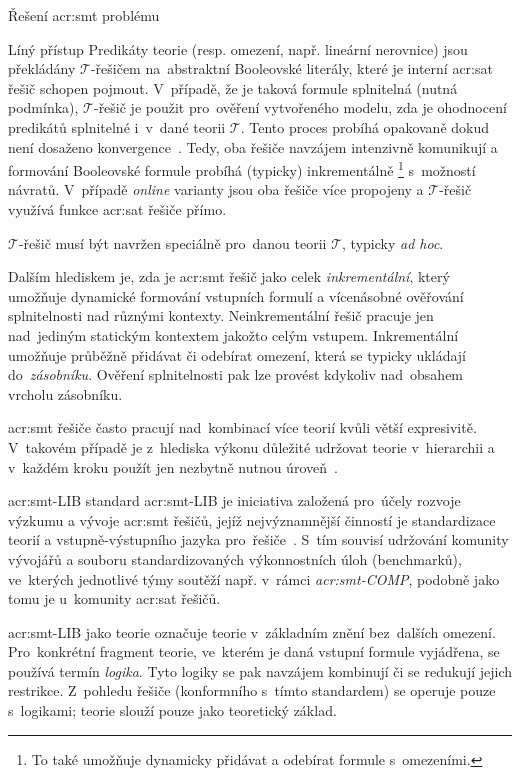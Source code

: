 \documentclass[thesis=M,czech]{FITthesis}[2012/06/26]
\newcommand{\acrlabel}[1]{acr:#1}
\newcommand{\acr}[1]{\acrshort{\acrlabel{#1}}}
\newcommand{\hl}[1]{\textit{#1}}
\newcommand{\name}[1]{\hl{#1}}
\newcommand{\cit}[1]{\cite{#1}}
\newcommand{\set}[1]{\ensuremath{\mathcal{#1}}}
\begin{document}
\begin{section}{Řešení \acr{smt} problému}
\begin{paragraph}{Líný přístup}
Predikáty teorie (resp. omezení, např. lineární nerovnice)
jsou překládány \set{T}-řešičem
na~abstraktní Booleovské literály,
které je interní \acr{sat} řešič schopen pojmout.
V~případě, že je taková formule splnitelná (nutná podmínka),
\set{T}-řešič je použit pro~ověření vytvořeného modelu,
zda je ohodnocení predikátů splnitelné i~v~dané teorii \set{T}.
Tento proces probíhá opakovaně
dokud není dosaženo konvergence~\cit{smt-de_moura}.
Tedy, oba řešiče navzájem intenzivně komunikují
a formování Booleovské formule probíhá (typicky) inkrementálně%
\footnote{To také umožňuje dynamicky
přidávat a odebírat formule s~omezeními.}
s~možností návratů.
V~případě \name{online} varianty jsou oba řešiče
více propojeny a \set{T}-řešič využívá funkce \acr{sat} řešiče přímo.

\set{T}-řešič musí být navržen
speciálně pro~danou teorii \set{T}, typicky \hl{ad hoc}.
\end{paragraph} %


\bigskip

Dalším hlediskem je, zda je \acr{smt} řešič jako celek
\name{inkrementální}, který umožňuje
dynamické formování vstupních formulí
a vícenásobné ověřování splnitelnosti nad různými kontexty.
Neinkrementální řešič pracuje jen nad~jediným statickým kontextem
jakožto celým vstupem. Inkrementální umožňuje
průběžně přidávat či odebírat omezení,
která se typicky ukládají do~\hl{zásobníku}.
Ověření splnitelnosti pak lze provést kdykoliv
nad~obsahem vrcholu zásobníku.

\acr{smt} řešiče často pracují nad~kombinací více teorií
kvůli větší expresivitě.
V~takovém případě je z~hlediska výkonu
důležité udržovat teorie v~hierarchii
a v~každém kroku použít
jen nezbytně nutnou úroveň~\cit{smt-stanford}.


\begin{subsection}{\acr{smt}-LIB standard}\label{ss:search:smt:smtlib}
\acr{smt}-LIB je iniciativa
založená pro~účely rozvoje výzkumu a vývoje \acr{smt} řešičů,
jejíž nejvýznamnější činností
je standardizace teorií
a vstupně-výstupního jazyka pro~řešiče~\cit{smtlib}.
S~tím souvisí udržování komunity vývojářů
a souboru standardizovaných výkonnostních úloh (benchmarků),
ve~kterých jednotlivé týmy soutěží např. v~rámci \name{\acr{smt}-COMP},
podobně jako tomu je u~komunity \acr{sat} řešičů.

\acr{smt}-LIB jako teorie označuje
teorie v~základním znění bez~dalších omezení.
Pro~konkrétní fragment teorie,
ve~kterém je daná vstupní formule vyjádřena,
se používá termín \name{logika}.
Tyto logiky se pak navzájem kombinují
či se redukují jejich restrikce.
Z~pohledu řešiče (konformního s~tímto standardem)
se operuje pouze s~logikami;
teorie slouží pouze jako teoretický základ.


\end{subsection}
\end{section}
\end{document}
